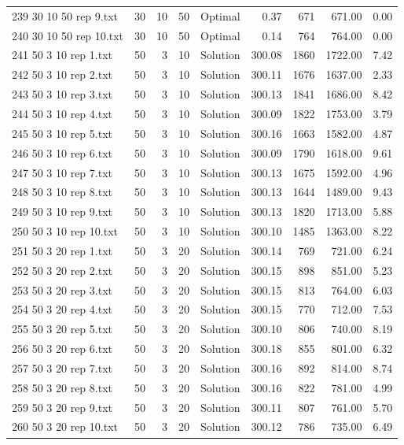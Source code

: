 \begin{longtable}{lrrllrrrr}
239 30 10 50 rep 9.txt & 30 & 10 & 50 & Optimal &  0.37 & 671 & 671.00 &  0.00\\
240 30 10 50 rep 10.txt & 30 & 10 & 50 & Optimal &  0.14 & 764 & 764.00 &  0.00\\
241 50 3 10 rep 1.txt & 50 & 3 & 10 & Solution & 300.08 & 1860 & 1722.00 &  7.42\\
242 50 3 10 rep 2.txt & 50 & 3 & 10 & Solution & 300.11 & 1676 & 1637.00 &  2.33\\
243 50 3 10 rep 3.txt & 50 & 3 & 10 & Solution & 300.13 & 1841 & 1686.00 &  8.42\\
244 50 3 10 rep 4.txt & 50 & 3 & 10 & Solution & 300.09 & 1822 & 1753.00 &  3.79\\
245 50 3 10 rep 5.txt & 50 & 3 & 10 & Solution & 300.16 & 1663 & 1582.00 &  4.87\\
246 50 3 10 rep 6.txt & 50 & 3 & 10 & Solution & 300.09 & 1790 & 1618.00 &  9.61\\
247 50 3 10 rep 7.txt & 50 & 3 & 10 & Solution & 300.13 & 1675 & 1592.00 &  4.96\\
248 50 3 10 rep 8.txt & 50 & 3 & 10 & Solution & 300.13 & 1644 & 1489.00 &  9.43\\
249 50 3 10 rep 9.txt & 50 & 3 & 10 & Solution & 300.13 & 1820 & 1713.00 &  5.88\\
250 50 3 10 rep 10.txt & 50 & 3 & 10 & Solution & 300.10 & 1485 & 1363.00 &  8.22\\
251 50 3 20 rep 1.txt & 50 & 3 & 20 & Solution & 300.14 & 769 & 721.00 &  6.24\\
252 50 3 20 rep 2.txt & 50 & 3 & 20 & Solution & 300.15 & 898 & 851.00 &  5.23\\
253 50 3 20 rep 3.txt & 50 & 3 & 20 & Solution & 300.15 & 813 & 764.00 &  6.03\\
254 50 3 20 rep 4.txt & 50 & 3 & 20 & Solution & 300.15 & 770 & 712.00 &  7.53\\
255 50 3 20 rep 5.txt & 50 & 3 & 20 & Solution & 300.10 & 806 & 740.00 &  8.19\\
256 50 3 20 rep 6.txt & 50 & 3 & 20 & Solution & 300.18 & 855 & 801.00 &  6.32\\
257 50 3 20 rep 7.txt & 50 & 3 & 20 & Solution & 300.16 & 892 & 814.00 &  8.74\\
258 50 3 20 rep 8.txt & 50 & 3 & 20 & Solution & 300.16 & 822 & 781.00 &  4.99\\
259 50 3 20 rep 9.txt & 50 & 3 & 20 & Solution & 300.11 & 807 & 761.00 &  5.70\\
260 50 3 20 rep 10.txt & 50 & 3 & 20 & Solution & 300.12 & 786 & 735.00 &  6.49\\

\end{longtable}
